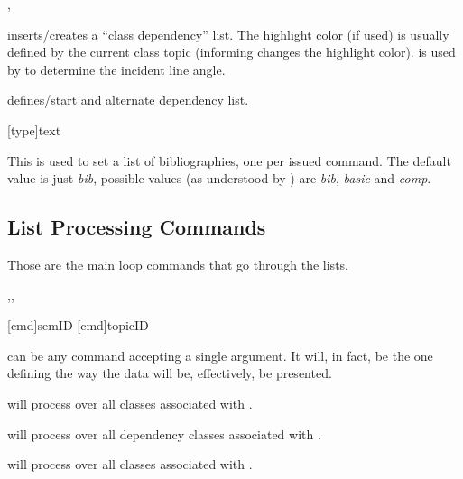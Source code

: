 \documentclass[article,nogeometry,english,tocdepth=3,secdepth=3]{ufrgscca} %
\begin{document}
\begin{codedescribe}{\depdef,\altdef}
    \begin{codesyntax}%
        \tsmacro{\altdef}{}
    \end{codesyntax}
\tsmacro{\depdef}{} inserts/creates a “class dependency” list. The highlight color (if used) is usually defined by the current class topic (informing  changes the highlight color).  is used by  to determine the incident line angle.

\tsmacro{\altdef}{} defines/start and alternate dependency list.
\end{codedescribe}

\begin{codedescribe}{\bibdef}
    \begin{codesyntax}%
        \tsmacro{\bibdef}[type]{text}
    \end{codesyntax}
This is used to set a list of bibliographies, one per issued command. The default  value is just \emph{bib}, possible values (as understood by ) are \emph{bib}, \emph{basic} and \emph{comp}.
\end{codedescribe}

\subsection{List Processing Commands}
Those are the main loop commands that go through the lists.
\begin{codedescribe}{\LstClass,\LstDep,\LstTopic}
    \begin{codesyntax}
        \tsmacro{\LstClass}[cmd]{semID}
        \tsmacro{\LstTopic}[cmd]{topicID}
    \end{codesyntax}
 can be any command accepting a single argument. It will, in fact, be the one defining the way the data will be, effectively, be presented.

\tsmacro{\LstClass}{} will process  over all classes associated with .

\tsmacro{\LstDep}{} will process  over all dependency classes associated with .

\tsmacro{\LstTopic}{} will process  over all classes associated with .

\end{codedescribe}
\end{document}
